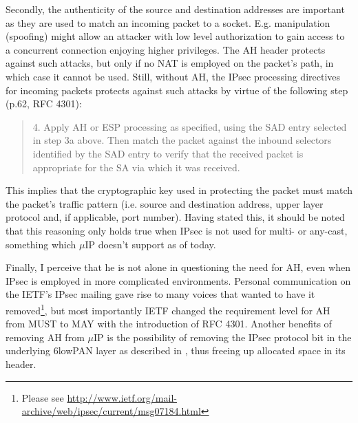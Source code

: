 \documentclass[final,a4paper,twoside,11pt,onecolumn]{report}
\begin{document}
Secondly, the authenticity of the source and destination addresses are important as they are used to match an incoming packet to a socket. E.g. manipulation (spoofing) might allow an attacker with low level authorization to gain access to a concurrent connection enjoying higher privileges. The AH header protects against such attacks, but only if no NAT is employed on the packet's path, in which case it cannot be used. Still, without AH, the IPsec processing directives for incoming packets protects against such attacks by virtue of the following step (p.62, RFC 4301):


\begin{quotation}
4.  Apply AH or ESP processing as specified, using the SAD entry
    selected in step 3a above. Then match the packet against the
    inbound selectors identified by the SAD entry to verify that the
    received packet is appropriate for the SA via which it was
    received.
\end{quotation}

This implies that the cryptographic key used in protecting the packet must match the packet's traffic pattern (i.e. source and destination address, upper layer protocol and, if applicable, port number). Having stated this, it should be noted that this reasoning only holds true when IPsec is not used for multi- or any-cast, something which $\mu$IP doesn't support as of today.

Finally, I perceive that he is not alone in questioning the need for AH, even when IPsec is employed in more complicated environments. Personal communication on the IETF's IPsec mailing gave rise to many voices that wanted to have it removed\footnote{Please see \url{http://www.ietf.org/mail-archive/web/ipsec/current/msg07184.html}}, but most importantly IETF changed the requirement level for AH from MUST to MAY with the introduction of RFC 4301. Another benefits of removing AH from $\mu$IP is the possibility of removing the IPsec protocol bit in the underlying 6lowPAN layer as described in \cite{raza2011securing}, thus freeing up allocated space in its header.



% 
% 
% 
\end{document}
